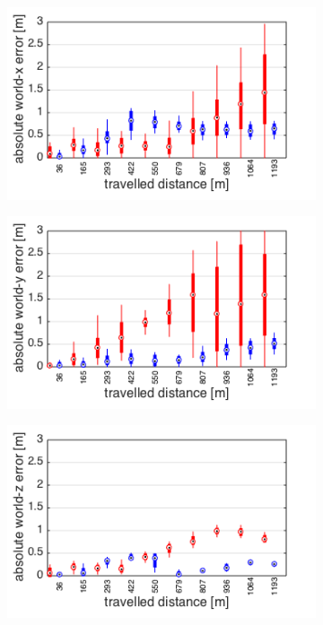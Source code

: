 \begin{figure}[h]
\begin{subfigure}[b]{0.48\textwidth}
    \caption{}
  \end{subfigure}
  \hfill
  \begin{subfigure}[b]{0.48\textwidth}
    \includegraphics[width=\textwidth]{images/ijrr/ate_x.png}
    \caption{}
  \end{subfigure}
  \begin{subfigure}[b]{0.48\textwidth}
    \includegraphics[width=\textwidth]{images/ijrr/ate_y.png}
    \caption{}
  \end{subfigure}
  \hfill
  \begin{subfigure}[b]{0.48\textwidth}
    \includegraphics[width=\textwidth]{images/ijrr/ate_z_2.png}

\end{subfigure}
\end{figure}
